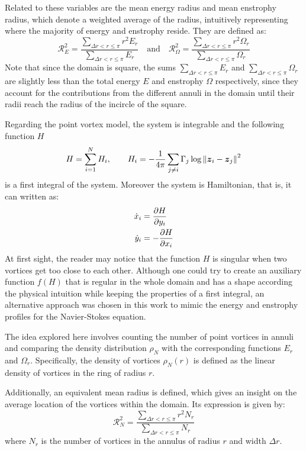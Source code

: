\documentclass[../main.tex]{subfiles}
\begin{document}
Related to these variables are the mean energy radius and mean enstrophy radius, which denote a weighted average of the radius, intuitively representing where the majority of energy and enstrophy reside. They are defined as:
\begin{equation}
	\mathcal{R}_E^2      = \frac{\sum_{\Delta r<r\leq \pi} r^2 E_r}{\sum_{\Delta r<r\leq \pi} E_r}\quad \text{and}  \quad
	\mathcal{R}_\Omega^2 = \frac{\sum_{\Delta r<r\leq \pi} r^2 \Omega_r}{\sum_{\Delta r<r\leq \pi} \Omega_r}
\end{equation}
Note that since the domain is square, the sums $\sum_{\Delta r<r\leq \pi}  E_r$ and $\sum_{\Delta r<r\leq \pi}  \Omega_r$ are slightly less than the total energy $E$ and enstrophy $\Omega$ respectively, since they account for the contributions from the different annuli in the domain until their radii reach the radius of the incircle of the square.

Regarding the point vortex model, the system is integrable and the following function $H$
\begin{equation}
	H = \sum_{i=1}^{N} H_i,\qquad H_i = -\frac{1}{4\pi} \sum_{j\neq i} \Gamma_j \log{\left\|\boldsymbol{z}_i-\boldsymbol{z}_j\right\|^2}
\end{equation}
is a first integral of the system. Moreover the system is Hamiltonian, that is, it can written as:
\begin{align}
	\dot{x}_i & = \pdv{H}{y_i}  \\
	\dot{y}_i & = -\pdv{H}{x_i}
\end{align}
At first sight, the reader may notice that the function $H$ is singular when two vortices get too close to each other. Although one could try to create an auxiliary function $f(H)$ that is regular in the whole domain and has a shape according the physical intuition while keeping the properties of a first integral, an alternative approach was chosen in this work to mimic the energy and enstrophy profiles for the Navier-Stokes equation.

The idea explored here involves counting the number of point vortices in annuli and comparing the density distribution $\rho_N$ with the corresponding functions $E_r$ and $\Omega_r$. Specifically, the density of vortices $\rho_N(r)$ is defined as the linear density of vortices in the ring of radius $r$.

Additionally, an equivalent mean radius is defined, which gives an insight on the average location of the vortices within the domain. Its expression is given by:
\begin{equation}\label{eq:meanradius_vortices}
	\mathcal{R}_N^2 = \frac{\sum_{\Delta r<r\leq \pi} r^2 N_r}{\sum_{\Delta r<r\leq \pi} N_r}
\end{equation}
where $N_r$ is the number of vortices in the annulus of radius $r$ and width $\Delta r$.
\end{document}
